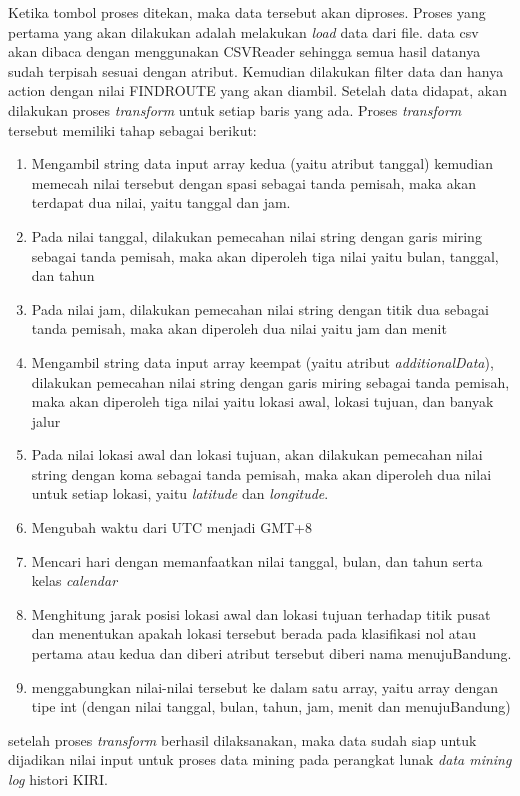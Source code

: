 Ketika tombol proses ditekan, maka data tersebut akan diproses. Proses yang pertama yang akan dilakukan adalah melakukan \textsl{load} data dari file. data csv akan dibaca dengan menggunakan CSVReader sehingga semua hasil datanya sudah terpisah sesuai dengan atribut. Kemudian dilakukan filter data dan hanya action dengan nilai FINDROUTE yang akan diambil. Setelah data didapat, akan dilakukan proses \textsl{transform} untuk setiap baris yang ada. Proses \textsl{transform} tersebut memiliki tahap sebagai berikut:
\begin{enumerate}
	\item Mengambil string data input array kedua (yaitu atribut tanggal) kemudian memecah nilai tersebut dengan spasi sebagai tanda pemisah, maka akan terdapat dua nilai, yaitu tanggal dan jam.
	\item Pada nilai tanggal, dilakukan pemecahan nilai string dengan garis miring sebagai tanda pemisah, maka akan diperoleh tiga nilai yaitu bulan, tanggal, dan tahun
	\item Pada nilai jam, dilakukan pemecahan nilai string dengan titik dua sebagai tanda pemisah, maka akan diperoleh dua nilai yaitu jam dan menit
	\item Mengambil string data input array keempat (yaitu atribut \textsl{additionalData}), dilakukan pemecahan nilai string dengan garis miring sebagai tanda pemisah, maka akan diperoleh tiga nilai yaitu lokasi awal, lokasi tujuan, dan banyak jalur
	\item Pada nilai lokasi awal dan lokasi tujuan, akan dilakukan pemecahan nilai string dengan koma sebagai tanda pemisah, maka akan diperoleh dua nilai untuk setiap lokasi, yaitu \textsl{latitude} dan \textsl{longitude}.
	\item Mengubah waktu dari UTC menjadi GMT+8
	\item Mencari hari dengan memanfaatkan nilai tanggal, bulan, dan tahun serta kelas \textsl{calendar}
	\item Menghitung jarak posisi lokasi awal dan lokasi tujuan terhadap titik pusat dan menentukan apakah lokasi tersebut berada pada klasifikasi nol atau pertama atau kedua dan diberi atribut tersebut diberi nama menujuBandung.
	\item menggabungkan nilai-nilai tersebut ke dalam satu array, yaitu array dengan tipe int (dengan nilai tanggal, bulan, tahun, jam, menit dan menujuBandung)
\end{enumerate}

setelah proses \textsl{transform} berhasil dilaksanakan, maka data sudah siap untuk dijadikan nilai input untuk proses data mining pada perangkat lunak \textsl{data mining log} histori KIRI.

